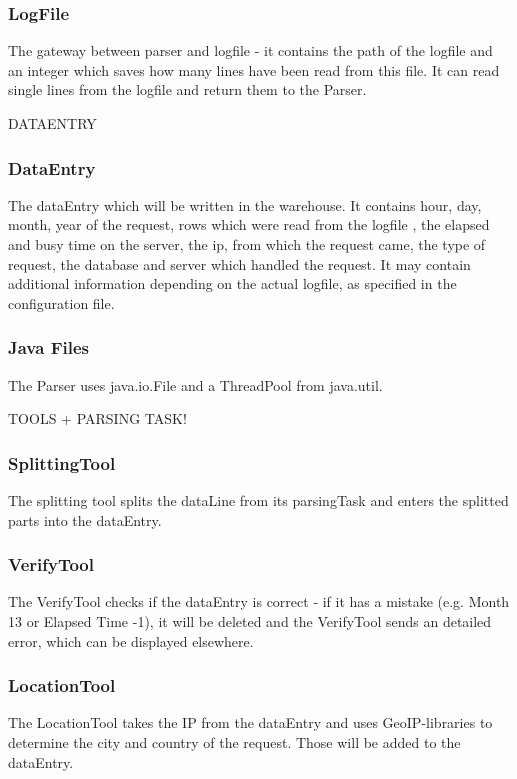 \subsubsection*{LogFile}
The gateway between parser and logfile - it contains the path of the logfile and an integer 
which saves how many lines have been read from this file. It can read single lines from the logfile and return them to 
the Parser.

DATAENTRY

\subsubsection*{DataEntry}
The dataEntry which will be written in the warehouse. It contains hour, day, month, year of the request, rows which were read 
from the logfile%
, the elapsed and busy time on the server, the ip, from which the request came, the type of request, the database
and server which handled the request.
It may contain additional information depending on the actual logfile, as specified in the configuration file. %

\subsubsection*{Java Files}
The Parser uses java.io.File and a ThreadPool from java.util.

TOOLS + PARSING TASK!

\subsubsection*{SplittingTool}
The splitting tool splits the dataLine from its parsingTask and enters the splitted parts into the dataEntry.

\subsubsection*{VerifyTool}
The VerifyTool checks if the dataEntry is correct - if it has a mistake (e.g. Month 13 or Elapsed Time -1), it will 
be deleted and the VerifyTool sends an detailed error, which can be displayed elsewhere.

\subsubsection*{LocationTool}
The LocationTool takes the IP from the dataEntry and uses GeoIP-libraries to determine the city and country of the request.
Those will be added to the dataEntry.

